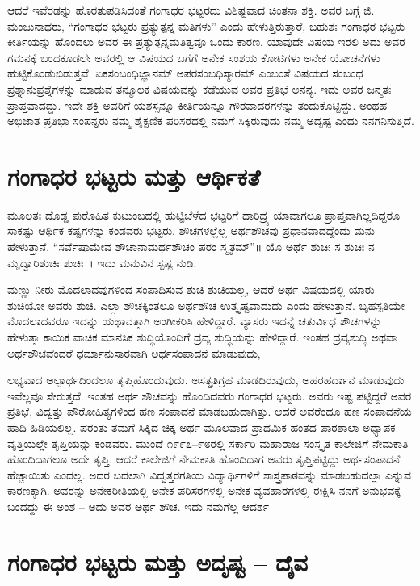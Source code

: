 {ಆದರೆ ಇವೆರಡನ್ನು ಹೊರತುಪಡಿಸಿದಂತೆ ಗಂಗಾಧರ ಭಟ್ಟರದು ವಿಶಿಷ್ಟವಾದ ಚಿಂತನಾ ಶಕ್ತಿ. ಅವರ ಬಗ್ಗೆ ಜಿ. ಮಂಜುನಾಥರು, “ಗಂಗಾಧರ ಭಟ್ಟರು ಪ್ರತ್ಯುತ್ಪನ್ನ ಮತಿಗಳು” ಎಂದು ಹೇಳುತ್ತಿರುತ್ತಾರೆ, ಬಹುಶಃ ಗಂಗಾಧರ ಭಟ್ಟರು ಕೀರ್ತಿಯನ್ನು ಹೊಂದಲು ಅವರ ಈ ಪ್ರತ್ಯುತ್ಪನ್ನಮತಿತ್ವವೂ ಒಂದು ಕಾರಣ. ಯಾವುದೇ ವಿಷಯ ಇರಲಿ ಅದು ಅವರ ಗಮನಕ್ಕೆ ಬಂದಕೂಡಲೇ ಅವರಲ್ಲಿ ಆ ವಿಷಯದ ಬಗೆಗೆ ಅನೇಕ ಸಂಶಯ ಕೋಟಿಗಳು ಅನೇಕ ಯೋಚನೆಗಳು ಹುಟ್ಟಿಕೊಂಡುಬಿಡುತ್ತವೆ. ಏಕಸಂಬಂಧಿಜ್ಞಾನಮ್ ಅಪರಸಂಬಧಿಸ್ಮಾರಮ್ ಎಂಬಂತೆ ವಿಷಯದ ಸಂಬಂಧ ಪ್ರಶ್ನಾನುಪ್ರಶ್ನೆಗಳನ್ನು ಮಾಡುವ ತನ್ಮೂಲಕ ವಿಷಯವನ್ನು ಕಡೆಯುವ ಅವರ ಪ್ರತಿಭೆ ಅನನ್ಯ. ಇದು ಅವರ ಜನ್ಮತಃ ಪ್ರಾಪ್ತವಾದದ್ದು. ಇದೇ ಶಕ್ತಿ ಅವರಿಗೆ ಯಶಸ್ಸನ್ನೂ ಕೀರ್ತಿಯನ್ನೂ ಗೌರವಾದರಗಳನ್ನು ತಂದುಕೊಟ್ಟಿದ್ದು. ಅಂಥಹ ಅಭಿಜಾತ ಪ್ರತಿಭಾ ಸಂಪನ್ನರು ನಮ್ಮ ಶೈಕ್ಷಣಿಕ ಪರಿಸರದಲ್ಲಿ ನಮಗೆ ಸಿಕ್ಕಿರುವುದು ನಮ್ಮ ಅದೃಷ್ಟ ಎಂದು ನನಗನಿಸುತ್ತಿದೆ.

\section*{ಗಂಗಾಧರ ಭಟ್ಟರು ಮತ್ತು ಆರ್ಥಿಕತೆ}

ಮೂಲತಃ ದೊಡ್ಡ ಪುರೊಹಿತ ಕುಟುಂಬದಲ್ಲಿ ಹುಟ್ಟಿಬೆಳೆದ ಭಟ್ಟರಿಗೆ ದಾರಿದ್ರ್ಯ ಯಾವಾಗಲೂ ಪ್ರಾಪ್ತವಾಗಿಲ್ಲದಿದ್ದರೂ ಸಾಕಷ್ಟು ಆರ್ಥಿಕ ಕಷ್ಟಗಳನ್ನು ಕಂಡವರು ಭಟ್ಟರು. ಶೌಚಗಳಲ್ಲೆಲ್ಲ ಅರ್ಥಶೌಚವು ಪ್ರಧಾನವಾದದ್ದೆಂದು ಮನು ಹೇಳುತ್ತಾನೆ. “ಸರ್ವೆಷಾಮೇವ ಶೌಚಾನಾಮರ್ಥಶೌಚಂ ಪರಂ ಸ್ಮೃತಮ್”॥ ಯೊ ಅರ್ಥೆ ಶುಚಿಃ ಸ ಶುಚಿಃ ನ ಮೃದ್ವಾರಿಶುಚಿಃ ಶುಚಿಃ~। ಇದು ಮನುವಿನ ಸ್ಪಷ್ಟ ನುಡಿ. 

ಮಣ್ಣು ನೀರು ಮೊದಲಾದವುಗಳಿಂದ ಸಂಪಾದಿಸುವ ಶುಚಿ ಶುಚಿಯಲ್ಲ, ಆದರೆ ಅರ್ಥ ವಿಷಯದಲ್ಲಿ ಯಾರು ಶುಚಿಯೋ ಅವರು ಶುಚಿ. ಎಲ್ಲಾ ಶೌಚಕ್ಕಿಂತಲೂ ಅರ್ಥಶೌಚ ಉತ್ಕೃಷ್ಟವಾದುದು ಎಂದು ಹೇಳುತ್ತಾನೆ. ಬೃಹಸ್ಪತಿಯೇ ಮೊದಲಾದವರೂ ಇದನ್ನು ಯಥಾವತ್ತಾಗಿ ಅಂಗೀಕರಿಸಿ ಹೇಳಿದ್ದಾರೆ. ವ್ಯಾಸರು ಇದನ್ನೆ ಚತುರ್ವಿಧ ಶೌಚಗಳನ್ನು ಹೇಳುತ್ತಾ ಕಾಯಿಕ ವಾಚಿಕ ಮಾನಸಿಕ ಶುದ್ಧಿಯೊಂದಿಗೆ ದ್ರವ್ಯ ಶುದ್ಧಿಯನ್ನು ಹೇಳಿದ್ದಾರೆ. ಇಂತಹ ದ್ರವ್ಯಶುದ್ಧಿ ಅಥವಾ ಅರ್ಥಶೌಚವೆಂದರೆ ಧರ್ಮಾನುಸಾರವಾಗಿ ಅರ್ಥಸಂಪಾದನೆ ಮಾಡುವುದು,

ಲಭ್ಯವಾದ ಅಲ್ಪಾರ್ಥದಿಂದಲೂ ತೃಪ್ತಿಹೊಂದುವುದು. ಅಸತ್ಪ್ರತಿಗ್ರಹ ಮಾಡದಿರುವುದು, ಅಹರಹರ್ದಾನ ಮಾಡುವುದು ಇವೆಲ್ಲವೂ ಸೇರುತ್ತದೆ. ಇಂತಹ ಅರ್ಥ ಶೌಚವನ್ನು ಹೊಂದಿದವರು ಗಂಗಾಧರ ಭಟ್ಟರು. ಅವರು ಇಷ್ಟ ಪಟ್ಟಿದ್ದರೆ ಅವರ ಪ್ರತಿಭೆ, ವಿದ್ವತ್ತು ಪೌರೋಹಿತ್ಯಗಳಿಂದ ಹಣ ಸಂಪಾದನೆ ಮಾಡಬಹುದಾಗಿತ್ತು. ಆದರೆ ಅವರೆಂದೂ ಹಣ ಸಂಪಾದನೆಯ ಹಾದಿ ಹಿಡಿಯಲಿಲ್ಲ. ಪರಂತು ತಮಗೆ ಸಿಕ್ಕಿದ ಚಿಕ್ಕ ಅರ್ಥ ಮೂಲವಾದ ಪ್ರಾಥಮಿಕ ಹಂತದ ಪಾಠಶಾಲಾ ಅಧ್ಯಾಪಕ ವೃತ್ತಿಯಲ್ಲೇ ತೃಪ್ತಿಯನ್ನು ಕಂಡವರು. ಮುಂದೆ ೧೯೯೭–೯೮ರಲ್ಲಿ ಸರ್ಕಾರಿ ಮಹಾರಾಜ ಸಂಸ್ಕೃತ ಕಾಲೇಜಿಗೆ ನೇಮಕಾತಿ ಹೊಂದಿದಾಗಲೂ ಅದೇ ತೃಪ್ತಿ. ಆದರೆ ಕಾಲೇಜಿಗೆ ನೇಮಕಾತಿ ಹೊಂದಿದಾಗ ಅವರು ತೃಪ್ತಿಪಟ್ಟಿದ್ದು ಅರ್ಥಸಂಪಾದನೆ ಹೆಚ್ಚಾಯಿತು ಎಂದಲ್ಲ. ಅದರ ಬದಲಾಗಿ ವಿದ್ವತ್ತರಗತಿಯ ವಿದ್ಯಾರ್ಥಿಗಳಿಗೆ ಶಾಸ್ತ್ರಪಾಠವನ್ನು ಮಾಡಬಹುದಲ್ಲಾ ಎನ್ನುವ ಕಾರಣಕ್ಕಾಗಿ. ಅವರನ್ನು ಅನೇಕರೀತಿಯಲ್ಲಿ ಅನೇಕ ಪರಿಸರಗಳಲ್ಲಿ ಅನೇಕ ವ್ಯವಹಾರಗಳಲ್ಲಿ ಈಕ್ಷಿಸಿ ನನಗೆ ಅನುಭವಕ್ಕೆ ಬಂದದ್ದು ಈ ಅಂಶ – ಅದು ಅವರ ಅರ್ಥ ಶೌಚ. ಇದು ನಮಗೆಲ್ಲ ಆದರ್ಶ 

\section*{ಗಂಗಾಧರ ಭಟ್ಟರು ಮತ್ತು ಅದೃಷ್ಟ – ದೈವ}

}
